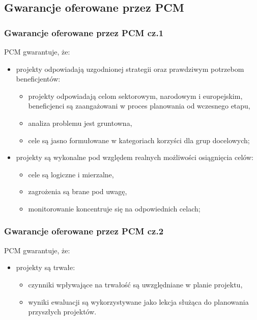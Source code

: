 \documentclass{beamer}
\begin{document}
\subsection{Gwarancje oferowane przez PCM}

\begin{frame}\frametitle{Gwarancje oferowane przez PCM cz.1}
    \begin{exampleblock}{PCM gwarantuje, że:}
    \begin{itemize}
        \item projekty odpowiadają uzgodnionej strategii oraz prawdziwym potrzebom beneficjentów: 
        \begin{itemize}
            \item projekty odpowiadają celom sektorowym, narodowym i europejskim, 
            beneficjenci są zaangażowani w proces planowania od wczesnego etapu,
            \item analiza problemu jest gruntowna, 
            \item cele są jasno formułowane w kategoriach korzyści dla grup docelowych; 
        \end{itemize}
        \item projekty są wykonalne pod względem realnych możliwości osiągnięcia celów: 
        \begin{itemize}
            \item cele są logiczne i mierzalne, 
            \item zagrożenia są brane pod uwagę, 
            \item monitorowanie koncentruje się na odpowiednich celach;
        \end{itemize}
    \end{itemize}

 


    \end{exampleblock}
\end{frame}

\begin{frame}\frametitle{Gwarancje oferowane przez PCM cz.2}
    \begin{exampleblock}{PCM gwarantuje, że:}
    \begin{itemize}
        \item projekty są trwałe: 
        \begin{itemize}
            \item czynniki wpływające na trwałość są uwzględniane w planie projektu,
            \item wyniki ewaluacji są wykorzystywane jako lekcja służąca do planowania przyszłych projektów.
        \end{itemize}
    \end{itemize}
    \end{exampleblock}
\end{frame}
\end{document}
